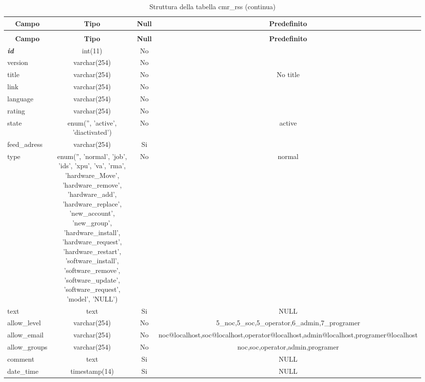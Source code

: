 %
%
 \begin{longtable}{|l|c|c|c|} 
 \caption{Struttura della tabella cmr\_rss} \label{tab:cmr_rss-structure} \\
 \hline \multicolumn{1}{|c|}{\textbf{Campo}} & \multicolumn{1}{|c|}{\textbf{Tipo}} & \multicolumn{1}{|c|}{\textbf{Null}} & \multicolumn{1}{|c|}{\textbf{Predefinito}} \\ \hline \hline
\endfirsthead
 \caption{Struttura della tabella cmr\_rss (continua)} \\ 
 \hline \multicolumn{1}{|c|}{\textbf{Campo}} & \multicolumn{1}{|c|}{\textbf{Tipo}} & \multicolumn{1}{|c|}{\textbf{Null}} & \multicolumn{1}{|c|}{\textbf{Predefinito}} \\ \hline \hline \endhead \endfoot \textbf{\textit{id}} & int(11) &  No  &  \\ \hline 
version & varchar(254) &  No  &  \\ \hline 
title & varchar(254) &  No  & No title \\ \hline 
link & varchar(254) &  No  &  \\ \hline 
language & varchar(254) &  No  &  \\ \hline 
rating & varchar(254) &  No  &  \\ \hline 
state & enum('', 'active', 'diactivated') &  No  & active \\ \hline 
feed\_adress & varchar(254) &  Si  &  \\ \hline 
type & enum('', 'normal', 'job', 'ids', 'xpu', 'va', 'rma', 'hardware\_Move', 'hardware\_remove', 'hardware\_add', 'hardware\_replace', 'new\_account', 'new\_group', 'hardware\_install', 'hardware\_request', 'hardware\_restart', 'software\_install', 'software\_remove', 'software\_update', 'software\_request', 'model', 'NULL') &  No  & normal \\ \hline 
text & text &  Si  & NULL \\ \hline 
allow\_level & varchar(254) &  No  & 5\_noc,5\_soc,5\_operator,6\_admin,7\_programer \\ \hline 
allow\_email & varchar(254) &  No  & noc@localhost,soc@localhost,operator@localhost,admin@localhost,programer@localhost \\ \hline 
allow\_groups & varchar(254) &  No  & noc,soc,operator,admin,programer \\ \hline 
comment & text &  Si  & NULL \\ \hline 
date\_time & timestamp(14) &  Si  & NULL \\ \hline 
 \end{longtable}

